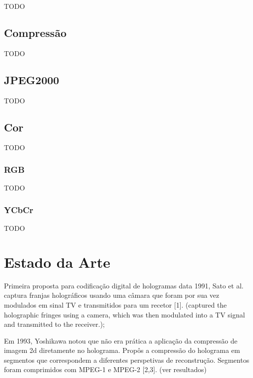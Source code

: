 TODO


\subsection{Compressão}
\label{ssec::estado-arte:compressao}

TODO

\subsection{JPEG2000}
\label{ssec::estado-arte:jpeg2000}

TODO


\subsection{Cor}
\label{ssec::estado-arte:cor}

TODO

\subsubsection{\ac{RGB}}
\label{sssec::estado-arte:cor:rgb}

TODO

\subsubsection{YCbCr}
\label{sssec::estado-arte:cor:ycbcr}

TODO


\section{Estado da Arte}
\label{sec::estado-arte:estado-arte}


Primeira proposta para codificação digital de hologramas data 1991, Sato et al. captura franjas holográficos usando uma câmara que foram por sua vez modulados em sinal TV e transmitidos para um recetor [1]. (captured the holographic fringes using a camera, which was then modulated into a TV signal and transmitted to the receiver.);
  
Em 1993, Yoshikawa notou que não era prática a aplicação da compressão de imagem 2d diretamente no holograma. Propôs a compressão do holograma em segmentos que correspondem a diferentes perspetivas de reconstrução. Segmentos foram comprimidos com MPEG-1 e MPEG-2 [2,3]. (ver resultados)

